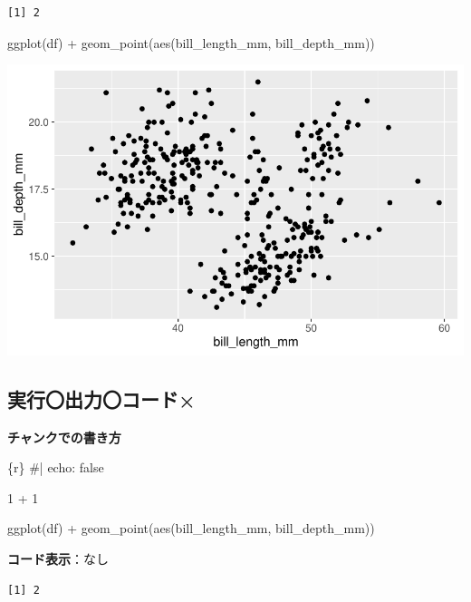\documentclass[
  b5paper,
  xelatex, ja=standard]{bxjsbook}
\newenvironment{Shaded}{\begin{snugshade}}{\end{snugshade}}
\newcommand{\FunctionTok}[1]{\textcolor[rgb]{0.28,0.35,0.67}{#1}}
\newcommand{\InformationTok}[1]{\textcolor[rgb]{0.37,0.37,0.37}{#1}}
\newcommand{\NormalTok}[1]{\textcolor[rgb]{0.00,0.23,0.31}{#1}}
\newcommand{\SpecialCharTok}[1]{\textcolor[rgb]{0.37,0.37,0.37}{#1}}
\begin{document}
\begin{verbatim}
[1] 2
\end{verbatim}

\begin{Shaded}
\begin{Highlighting}[]
\FunctionTok{ggplot}\NormalTok{(df) }\SpecialCharTok{+}
  \FunctionTok{geom\_point}\NormalTok{(}\FunctionTok{aes}\NormalTok{(bill\_length\_mm, bill\_depth\_mm))}
\end{Highlighting}
\end{Shaded}

\includegraphics{basic_files/figure-pdf/unnamed-chunk-3-1.pdf}

\subsection{実行〇\textbar 出力〇\textbar コード×}

\textbf{チャンクでの書き方}

\begin{Shaded}
\begin{Highlighting}[]
\InformationTok{\textasciigrave{}\textasciigrave{}\textasciigrave{}\{r\}}
\InformationTok{\#| echo: false}

\InformationTok{1 + 1}


\InformationTok{ggplot(df) +}
\InformationTok{  geom\_point(aes(bill\_length\_mm, bill\_depth\_mm))}
\InformationTok{\textasciigrave{}\textasciigrave{}\textasciigrave{}}
\end{Highlighting}
\end{Shaded}

\textbf{コード表示}：なし

\begin{verbatim}
[1] 2
\end{verbatim}
\end{document}
